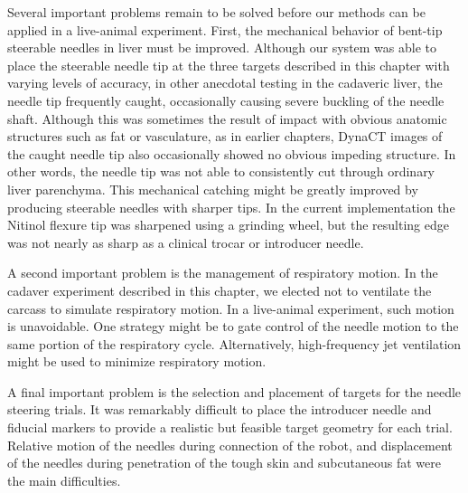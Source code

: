 Several important problems remain to be solved before our methods can be applied in a live-animal experiment. First, the mechanical behavior of bent-tip steerable needles in liver must be improved. Although our system was able to place the steerable needle tip at the three targets described in this chapter with varying levels of accuracy, in other anecdotal testing in the cadaveric liver, the needle tip frequently caught, occasionally causing severe buckling of the needle shaft. Although this was sometimes the result of impact with obvious anatomic structures such as fat or vasculature, as in earlier chapters, DynaCT images of the caught needle tip also occasionally showed no obvious impeding structure. In other words, the needle tip was not able to consistently cut through ordinary liver parenchyma. This mechanical catching might be greatly improved by producing steerable needles with sharper tips. In the current implementation the Nitinol flexure tip was sharpened using a grinding wheel, but the resulting edge was not nearly as sharp as a clinical trocar or introducer needle.

A second important problem is the management of respiratory motion. In the cadaver experiment described in this chapter, we elected not to ventilate the carcass to simulate respiratory motion. In a live-animal experiment, such motion is unavoidable. One strategy might be to gate control of the needle motion to the same portion of the respiratory cycle. Alternatively, high-frequency jet ventilation might be used to minimize respiratory motion.

A final important problem is the selection and placement of targets for the needle steering trials. It was remarkably difficult to place the introducer needle and fiducial markers to provide a realistic but feasible target geometry for each trial. Relative motion of the needles during connection of the robot, and displacement of the needles during penetration of the tough skin and subcutaneous fat were the main difficulties.


